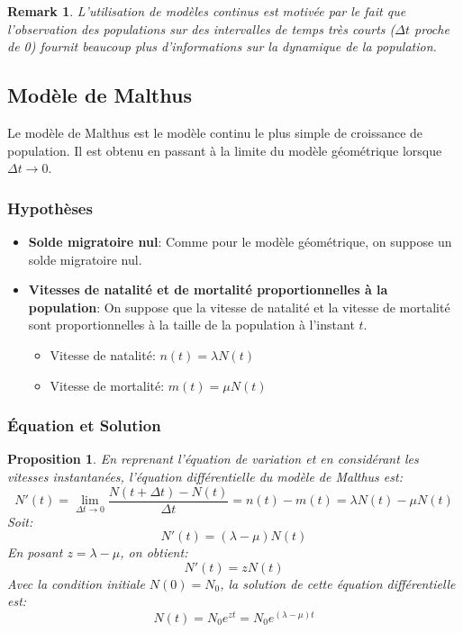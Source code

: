 \documentclass{article}
\newtheorem{proposition}{Proposition}
\newtheorem{remark}{Remark}
\begin{document}
\begin{remark}
L'utilisation de modèles continus est motivée par le fait que l'observation des populations sur des intervalles de temps très courts ($\Delta t$ proche de 0) fournit beaucoup plus d'informations sur la dynamique de la population.
\end{remark}


\subsection{Modèle de Malthus}

Le modèle de Malthus est le modèle continu le plus simple de croissance de population. Il est obtenu en passant à la limite du modèle géométrique lorsque $\Delta t \to 0$.

\subsubsection{Hypothèses}

\begin{itemize}
    \item \textbf{Solde migratoire nul}: Comme pour le modèle géométrique, on suppose un solde migratoire nul.
    \item \textbf{Vitesses de natalité et de mortalité proportionnelles à la population}: On suppose que la vitesse de natalité et la vitesse de mortalité sont proportionnelles à la taille de la population à l'instant $t$.
    \begin{itemize}
        \item Vitesse de natalité: $n(t) = \lambda N(t)$
        \item Vitesse de mortalité: $m(t) = \mu N(t)$
    \end{itemize}
\end{itemize}

\subsubsection{Équation et Solution}
\begin{proposition}
En reprenant l'équation de variation et en considérant les vitesses instantanées, l'équation différentielle du modèle de Malthus est:
\[
N'(t) = \lim_{\Delta t \to 0} \frac{N(t + \Delta t) - N(t)}{\Delta t} = n(t) - m(t) = \lambda N(t) - \mu N(t)
\]
Soit:
\[
N'(t) = (\lambda - \mu) N(t)
\]
En posant $z = \lambda - \mu$, on obtient:
\[
N'(t) = z N(t)
\]
Avec la condition initiale $N(0) = N_0$, la solution de cette équation différentielle est:
\[
N(t) = N_0 e^{zt} = N_0 e^{(\lambda - \mu)t}
\]
\end{proposition}
\end{document}
